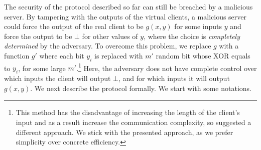 \documentclass{llncs}
\newcommand{\OTfunc}{\mathcal{OT}}
\newcommand{\OThybrid}{\OTfunc\mbox{-}\text{hybrid}}
\newcommand{\X}{\mathcal{X}}
\newcommand{\Y}{\mathcal{Y}}
\renewcommand{\Z}{\set{0,\ldots,k-1}}
\renewcommand{\b}{\myvec{b}}
\renewcommand{\a}{\myvec{a}}
\newcommand{\srvr}{\alpha}
\newcommand{\clnt}{\beta}
\newcommand{\local}{\varphi}
\renewcommand{\Sc}{\mathsf{S}}
\newcommand{\Cc}{\mathsf{C}}
\begin{document}
The security of the protocol described so far can still be breached by a malicious server. By tampering with the outputs of the virtual clients, a malicious server could force the output of the real client to be $g(x,y)$ for some inputs $y$ and force the output to be $\bot$ for other values of $y$, where the choice is \emph{completely determined} by the adversary. To overcome this problem, we replace $g$ with a function $g'$ where each bit $y_i$ is replaced with $m'$ random bit whose XOR equals to $y_i$, for some large $m'$.\footnote{This method has the disadvantage of increasing the length of the client's input and as a result increase the communication complexity, so \cite{IKOPS11} suggested a different approach. We stick with the presented approach, as we prefer simplicity over concrete efficiency.} Here, the adversary does not have complete control over which inputs the client will output $\bot$, and for which inputs it will output $g(x,y)$.
We next describe the protocol formally. We start with some notations.

\end{document}
